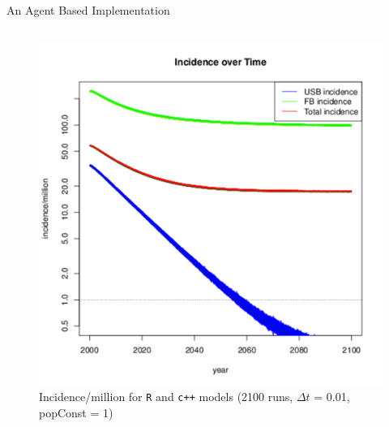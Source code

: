 \documentclass[final]{beamer}
\begin{document}
\begin{frame}
\begin{columns}
\begin{column}{.3\textwidth}
\begin{block}{An Agent Based Implementation}
\begin{block}{}
\begin{column}{.45\textwidth}
          \end{column}
          \begin{column}{.45\textwidth}
            \begin{figure}[h]
              \begin{center}
                \includegraphics[width=\textwidth]{finalRunSmall}
              \end{center}
              \caption{Incidence/million for \texttt{R} and \texttt{c++} models (2100 runs, $\Delta t$ = 0.01, popConst = 1)}
              \label{fig:finalRun}
            \end{figure}
          \end{column}
        \end{block}
      \end{block}
      

\end{column}
\end{columns}
\end{frame}
\end{document}
